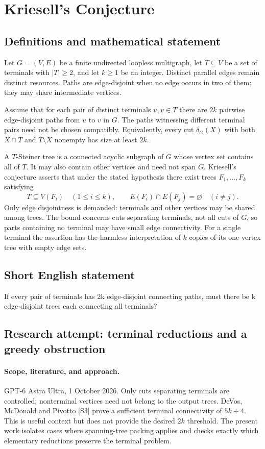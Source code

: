 \documentclass[11pt,a4paper]{article}
\begin{document}
\section*{Kriesell's Conjecture}\label{statement}

\subsection{Definitions and mathematical statement}
Let $G=(V,E)$ be a finite undirected loopless multigraph, let
$T\subseteq V$ be a set of terminals with $|T|\geq2$, and let
$k\geq1$ be an integer. Distinct parallel edges remain distinct
resources. Paths are edge-disjoint when no edge occurs in two
of them; they may share intermediate vertices.

Assume that for each pair of distinct terminals $u,v\in T$
there are $2k$ pairwise edge-disjoint paths from $u$ to $v$ in
$G$. The paths witnessing different terminal pairs need not be
chosen compatibly. Equivalently, every cut $\delta_G(X)$ with
both $X\cap T$ and $T\setminus X$ nonempty has size at least
$2k$.

A $T$-Steiner tree is a connected acyclic subgraph of $G$ whose
vertex set contains all of $T$. It may also contain other
vertices and need not span $G$. Kriesell's conjecture asserts
that under the stated hypothesis there exist trees
$F_1,\ldots,F_k$ satisfying
\[
 T\subseteq V(F_i)\quad(1\leq i\leq k),\qquad
 E(F_i)\cap E(F_j)=\varnothing\quad(i\neq j).
\]
Only edge disjointness is demanded: terminals and other vertices
may be shared among trees. The bound concerns cuts separating
terminals, not all cuts of $G$, so parts containing no terminal
may have small edge connectivity. For a single terminal the
assertion has the harmless interpretation of $k$ copies of its
one-vertex tree with empty edge sets.
\subsection{Short English statement}
If every pair of terminals has 2k edge-disjoint connecting paths, must there be k edge-disjoint trees each connecting all terminals?
\subsection{Research attempt: terminal reductions and a greedy obstruction}
\paragraph{Scope, literature, and approach.}
GPT-6 Astra Ultra, 1 October 2026. Only cuts separating terminals are
controlled; nonterminal vertices need not belong to the output trees.
DeVos, McDonald and Pivotto [S3] prove a sufficient terminal connectivity
of $5k+4$. This is useful context but does not provide the desired
$2k$ threshold. The present work isolates cases where spanning-tree
packing applies and checks exactly which elementary reductions preserve
the terminal problem.
\end{document}
